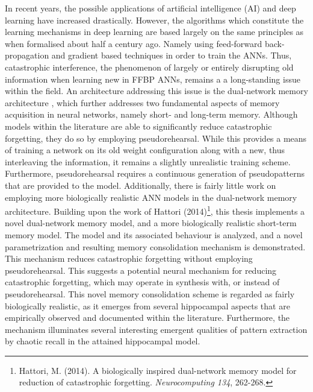{\fontsize{9}{8}\selectfont 
In recent years, the possible applications of artificial intelligence (AI) and deep learning have increased drastically. However, the algorithms which constitute the learning mechanisms in deep learning are based largely on the same principles as when formalised about half a century ago. Namely using feed-forward back-propagation and gradient based techniques in order to train the ANNs.
Thus, catastrophic interference, the phenomenon of largely or entirely disrupting old information when learning new in FFBP ANNs, remains a a long-standing issue within the field.
An architecture addressing this issue is the dual-network memory architecture
, which further addresses two fundamental aspects of memory acquisition in neural networks, namely short- and long-term memory. Although models within the literature are able to significantly reduce catastrophic forgetting,  they do so by employing pseudorehearsal. While this provides a means of training a network on its old weight configuration along with a new, thus interleaving the information, it remains a slightly unrealistic training scheme. Furthermore, pseudorehearsal requires a continuous generation of pseudopatterns that are provided to the model. Additionally, there is fairly little work on employing more biologically realistic ANN models in the dual-network memory architecture. Building upon the work of Hattori (2014)\footnote{Hattori, M. (2014).  A biologically inspired dual-network memory model for reduction of catastrophic forgetting. \textit{Neurocomputing 134}, 262-268.}, this thesis implements a novel dual-network memory model, and a more biologically realistic short-term memory model. The model and its associated behaviour is analyzed, and a novel parametrization and resulting memory consolidation mechanism is demonstrated. This mechanism reduces catastrophic forgetting without employing pseudorehearsal. This suggests a potential neural mechanism for reducing catastrophic forgetting, which may operate in synthesis with, or instead of pseudorehearsal. This novel memory consolidation scheme is regarded as fairly biologically realistic, as it emerges from several hippocampal aspects that are empirically observed and documented within the literature. Furthermore, the mechanism illuminates several interesting emergent qualities of pattern extraction by chaotic recall in the attained hippocampal model.
}

\clearpage